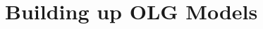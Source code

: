\documentclass[11pt]{article}%
\begin{document}
\newpage
\section{Building up OLG Models}







% 

\newpage

\newpage




\newpage
\appendix


\end{document}
